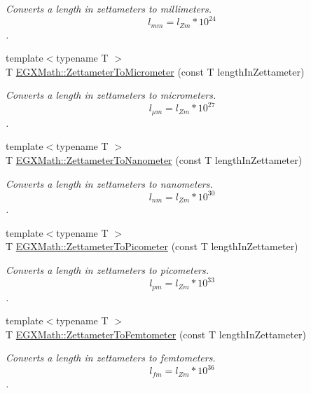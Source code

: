 \begin{DoxyCompactItemize}
\begin{DoxyCompactList}\small\item\em Converts a length in zettameters to millimeters. \[ l_{mm}=l_{Zm} * 10^{24} \]. \end{DoxyCompactList}\item 
{\footnotesize template$<$typename T $>$ }\\T \mbox{\hyperlink{group___e_g_x_math-_conversions-_length_conversions-_s_i-_zettameter-_s_i_ga495f68a50945d994b3f2d455b3348595}{E\+G\+X\+Math\+::\+Zettameter\+To\+Micrometer}} (const T length\+In\+Zettameter)
\begin{DoxyCompactList}\small\item\em Converts a length in zettameters to micrometers. \[ l_{\mu m}=l_{Zm} * 10^{27} \]. \end{DoxyCompactList}\item 
{\footnotesize template$<$typename T $>$ }\\T \mbox{\hyperlink{group___e_g_x_math-_conversions-_length_conversions-_s_i-_zettameter-_s_i_ga07934308bcd823e960e1c4be504e5afd}{E\+G\+X\+Math\+::\+Zettameter\+To\+Nanometer}} (const T length\+In\+Zettameter)
\begin{DoxyCompactList}\small\item\em Converts a length in zettameters to nanometers. \[ l_{nm}=l_{Zm} * 10^{30} \]. \end{DoxyCompactList}\item 
{\footnotesize template$<$typename T $>$ }\\T \mbox{\hyperlink{group___e_g_x_math-_conversions-_length_conversions-_s_i-_zettameter-_s_i_gae7835234c6727bbfd1e9ad40c54a4740}{E\+G\+X\+Math\+::\+Zettameter\+To\+Picometer}} (const T length\+In\+Zettameter)
\begin{DoxyCompactList}\small\item\em Converts a length in zettameters to picometers. \[ l_{pm}=l_{Zm} * 10^{33} \]. \end{DoxyCompactList}\item 
{\footnotesize template$<$typename T $>$ }\\T \mbox{\hyperlink{group___e_g_x_math-_conversions-_length_conversions-_s_i-_zettameter-_s_i_ga9af7bed274fea1c279796cd6113e79c4}{E\+G\+X\+Math\+::\+Zettameter\+To\+Femtometer}} (const T length\+In\+Zettameter)
\begin{DoxyCompactList}\small\item\em Converts a length in zettameters to femtometers. \[ l_{fm}=l_{Zm} * 10^{36} \]. \end{DoxyCompactList}\item 

\end{DoxyCompactItemize}
